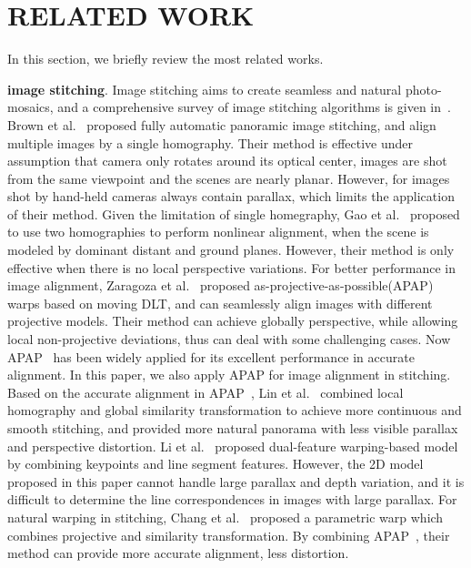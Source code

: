 \documentclass[10pt,journal,compsoc]{IEEEtran}
\begin{document}
 \section{RELATED WORK}
In this section, we briefly review the most related works.

\textbf{image stitching}.
Image stitching aims to create seamless and natural photo-mosaics, and a comprehensive survey of image stitching algorithms is given in~\cite{journals/ftcgv/Szeliski06}.
Brown et al.~\cite{journals/ijcv/BrownL07} proposed fully automatic panoramic image stitching, and align multiple images by a single homography. Their method is effective under assumption that camera only rotates around its optical center, images are shot from the same viewpoint and the scenes are nearly planar. However, for images shot by hand-held cameras always contain parallax, which limits the application of their method.
Given the limitation of single homegraphy, Gao et al.~\cite{conf/CVPR/GaoKB11} proposed to use two homographies to perform nonlinear alignment, when the scene is modeled by dominant distant and ground planes. However, their method is only effective when there is no local perspective variations.
For better performance in image alignment, Zaragoza et al.~\cite{journals/pami/ZaragozaCTBS14} proposed as-projective-as-possible(APAP) warps based on moving DLT, and can seamlessly align images with different projective models. Their method can achieve globally perspective, while allowing local non-projective deviations, thus can deal with some challenging cases. Now APAP~\cite{journals/pami/ZaragozaCTBS14}  has been widely applied for its excellent performance in accurate alignment. In this paper, we also apply APAP for image alignment in stitching.
Based on the accurate alignment in APAP~\cite{journals/pami/ZaragozaCTBS14}, Lin et al.~\cite{conf/CVPR/LinPRA15} combined local homography and global similarity transformation to achieve more continuous and smooth stitching, and provided more natural panorama with less visible parallax and perspective distortion.
Li et al.~\cite{conf/ICCV/LiY0Q15} proposed dual-feature warping-based model by combining keypoints and line segment features. However, the 2D model proposed in this paper cannot handle large parallax and depth variation, and it is difficult to determine the line correspondences in images with large parallax.
For natural warping in stitching, Chang et al.~\cite{conf/cvpr/ChangSC14} proposed a parametric warp which combines projective and similarity transformation. By combining APAP~\cite{journals/pami/ZaragozaCTBS14}, their method can provide more accurate alignment, less distortion.
\end{document}
